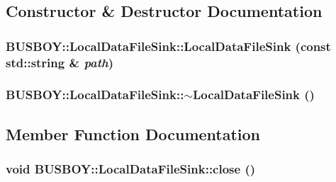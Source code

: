 \subsection{Constructor \& Destructor Documentation}
\hypertarget{classBUSBOY_1_1LocalDataFileSink_a1e7cdb2aab1e054cd3742f11654056a2}{
\subsubsection[{LocalDataFileSink}]{\setlength{\rightskip}{0pt plus 5cm}BUSBOY::LocalDataFileSink::LocalDataFileSink (const std::string \& {\em path})}}
\label{classBUSBOY_1_1LocalDataFileSink_a1e7cdb2aab1e054cd3742f11654056a2}
\hypertarget{classBUSBOY_1_1LocalDataFileSink_a1669f187a1735c543222347c90527fca}{
\subsubsection[{$\sim$LocalDataFileSink}]{\setlength{\rightskip}{0pt plus 5cm}BUSBOY::LocalDataFileSink::$\sim$LocalDataFileSink ()}}
\label{classBUSBOY_1_1LocalDataFileSink_a1669f187a1735c543222347c90527fca}


\subsection{Member Function Documentation}
\hypertarget{classBUSBOY_1_1LocalDataFileSink_a4f02e74ccc66d094135957cd1761457e}{
\subsubsection[{close}]{\setlength{\rightskip}{0pt plus 5cm}void BUSBOY::LocalDataFileSink::close ()}}
\label{classBUSBOY_1_1LocalDataFileSink_a4f02e74ccc66d094135957cd1761457e}


